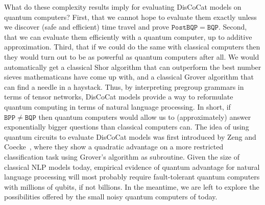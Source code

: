 What do these complexity results imply for evaluating DisCoCat models on quantum computers?
First, that we cannot hope to evaluate them exactly unless we discover (safe and efficient) time travel and prove $\mathtt{PostBQP} = \mathtt{BQP}$.
Second, that we can evaluate them efficiently with a quantum computer, up to additive approximation.
Third, that if we could do the same with classical computers then they would turn out to be as powerful as quantum computers after all.
We would automatically get a classical Shor algorithm that can outperform the best number sieves mathematicans have come up with, and a classical Grover algorithm that can find a needle in a haystack.
Thus, by interpreting pregroup grammars in terms of tensor networks, DisCoCat models provide a way to reformulate quantum computing in terms of natural language processing.
In short, if $\mathtt{BPP} \neq \mathtt{BQP}$ then quantum computers would allow us to (approximately) answer exponentially bigger questions than classical computers can.
The idea of using quantum circuits to evaluate DisCoCat models was first introduced by Zeng and Coecke~\cite{ZengCoecke16}, where they show a quadratic advantage on a more restricted classification task using Grover's algorithm as subroutine.
Given the size of classical NLP models today, empirical evidence of quantum advantage for natural language processing will most probably require fault-tolerant quantum computers with millions of qubits, if not billions.
In the meantime, we are left to explore the possibilities offered by the small noisy quantum computers of today.
